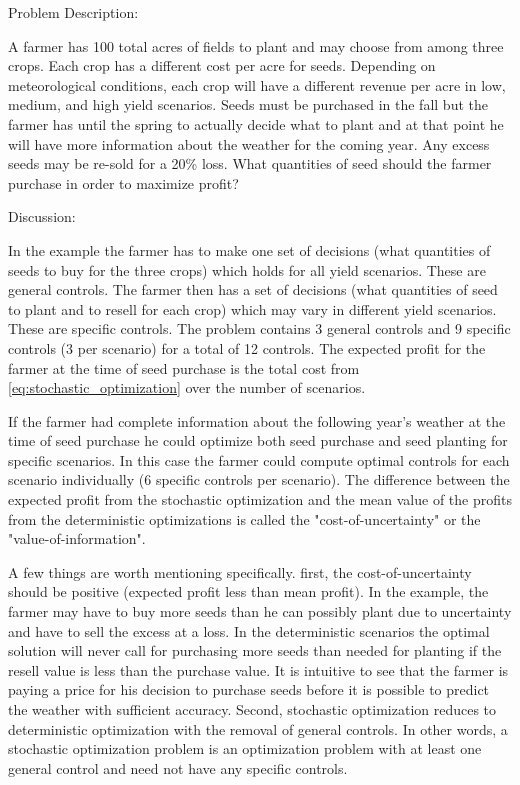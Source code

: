 \documentclass[12pt]{article}
\begin{document}
\noindent Problem Description:

\medskip

A farmer has 100 total acres of fields to plant and may choose from among three crops. Each crop has a different cost per acre for seeds. Depending on meteorological conditions, each crop will have a different revenue per acre in  low, medium, and high yield scenarios. Seeds must be purchased in the fall but the farmer has until the spring to actually decide what to plant and at that point he will have more information about the weather for the coming year. Any excess seeds may be re-sold for a 20\% loss. What quantities of seed should the farmer purchase in order to maximize profit?

\medskip

\noindent Discussion:

\medskip

In the example the farmer has to make one set of decisions (what quantities of seeds to buy for the three crops) which holds for all yield scenarios. These are general controls. The farmer then has a set of decisions (what quantities of seed to plant and to resell for each crop) which may vary in different yield scenarios. These are specific controls. The problem contains 3 general controls and 9 specific controls (3 per scenario) for a total of 12 controls. The expected profit for the farmer at the time of seed purchase is the total cost from \eqref{eq:stochastic_optimization} over the number of scenarios.

If the farmer had complete information about the following year's weather at the time of seed purchase he could optimize both seed purchase and seed planting for specific scenarios. In this case the farmer could compute optimal controls for each scenario individually (6 specific controls per scenario). The difference between the expected profit from the stochastic optimization and the mean value of the profits from the deterministic optimizations is called the "cost-of-uncertainty" or the "value-of-information".

A few things are worth mentioning specifically. first, the cost-of-uncertainty should be positive (expected profit less than mean profit). In the example, the farmer may have to buy more seeds than he can possibly plant due to uncertainty and have to sell the excess at a loss. In the deterministic scenarios the optimal solution will never call for purchasing more seeds than needed for planting if the resell value is less than the purchase value. It is intuitive to see that the farmer is paying a price for his decision to purchase seeds before it is possible to predict the weather with sufficient accuracy. Second, stochastic optimization reduces to deterministic optimization with the removal of general controls. In other words, a stochastic optimization problem is an optimization problem with at least one general control and need not have any specific controls.
	
\end{document}
